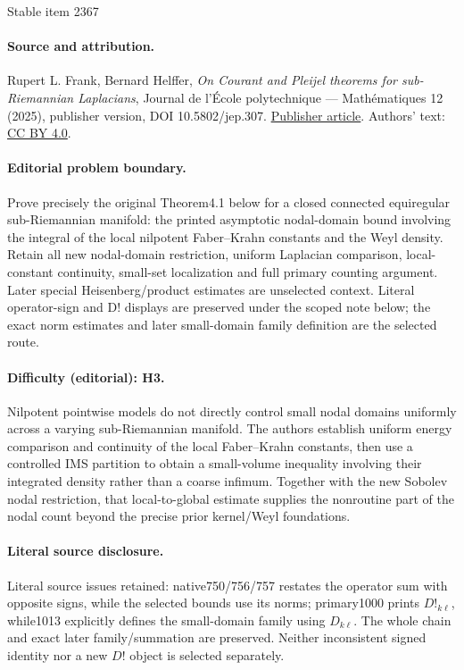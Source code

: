 \documentclass[11pt]{article}
\theoremstyle{definition}
\newcommand{\1}{\mathbbm{1}}
\numberwithin{equation}{section}
\begin{document}
\begin{center}{\Large Stable item 2367}\end{center}
\paragraph{Source and attribution.}
Rupert L. Frank, Bernard Helffer, \emph{On Courant and Pleijel theorems for sub-Riemannian Laplacians}, Journal de l’École polytechnique — Mathématiques 12 (2025), publisher version, DOI 10.5802/jep.307. \href{https://jep.centre-mersenne.org/articles/10.5802/jep.307/}{Publisher article}. Authors' text: \href{https://creativecommons.org/licenses/by/4.0/}{CC BY 4.0}.
\paragraph{Editorial problem boundary.}
Prove precisely the original Theorem4.1 below for a closed connected equiregular sub-Riemannian manifold: the printed asymptotic nodal-domain bound involving the integral of the local nilpotent Faber–Krahn constants and the Weyl density. Retain all new nodal-domain restriction, uniform Laplacian comparison, local-constant continuity, small-set localization and full primary counting argument. Later special Heisenberg/product estimates are unselected context. Literal operator-sign and D! displays are preserved under the scoped note below; the exact norm estimates and later small-domain family definition are the selected route.
\paragraph{Difficulty (editorial): H3.}
Nilpotent pointwise models do not directly control small nodal domains uniformly across a varying sub-Riemannian manifold. The authors establish uniform energy comparison and continuity of the local Faber–Krahn constants, then use a controlled IMS partition to obtain a small-volume inequality involving their integrated density rather than a coarse infimum. Together with the new Sobolev nodal restriction, that local-to-global estimate supplies the nonroutine part of the nodal count beyond the precise prior kernel/Weyl foundations.
\paragraph{Literal source disclosure.}
Literal source issues retained: native750/756/757 restates the operator sum with opposite signs, while the selected bounds use its norms; primary1000 prints $D!_{k\ell}$, while1013 explicitly defines the small-domain family using $D_{k\ell}$. The whole chain and exact later family/summation are preserved. Neither inconsistent signed identity nor a new $D!$ object is selected separately.
\end{document}
